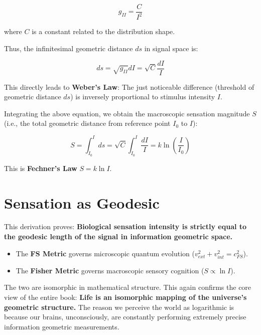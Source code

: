 $$g_{II} = \frac{C}{I^2}$$

where $C$ is a constant related to the distribution shape.

Thus, the infinitesimal geometric distance $ds$ in signal space is:

$$ds = \sqrt{g_{II}} dI = \sqrt{C} \frac{dI}{I}$$

This directly leads to \textbf{Weber's Law}: The just noticeable difference (threshold of geometric distance $ds$) is inversely proportional to stimulus intensity $I$.

Integrating the above equation, we obtain the macroscopic sensation magnitude $S$ (i.e., the total geometric distance from reference point $I_0$ to $I$):

$$S = \int_{I_0}^{I} ds = \sqrt{C} \int_{I_0}^{I} \frac{dI}{I} = k \ln \left( \frac{I}{I_0} \right)$$

This is \textbf{Fechner's Law} $S = k \ln I$.

\section{Sensation as Geodesic}

This derivation proves: \textbf{Biological sensation intensity is strictly equal to the geodesic length of the signal in information geometric space.}

\begin{itemize}
\item The \textbf{FS Metric} governs microscopic quantum evolution ($v_{ext}^2 + v_{int}^2 = c_{FS}^2$).

\item The \textbf{Fisher Metric} governs macroscopic sensory cognition ($S \propto \ln I$).
\end{itemize}

The two are isomorphic in mathematical structure. This again confirms the core view of the entire book: \textbf{Life is an isomorphic mapping of the universe's geometric structure.} The reason we perceive the world as logarithmic is because our brains, unconsciously, are constantly performing extremely precise information geometric measurements.

